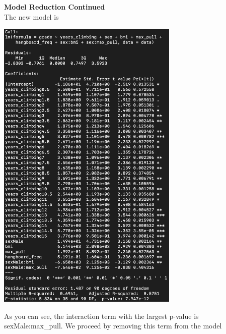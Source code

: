 \documentclass[11pt]{amsart}
\begin{document}
\newpage
{\bf Model Reduction Continued}\\
The new model is\\
\begin{center}
\includegraphics[width=0.65\textwidth]{mod5}
\end{center}
\vspace{0.15in}
As you can see, the interaction term with the largest p-value is sexMale:max\_pull.
We proceed by removing this term from the model
\end{document}
